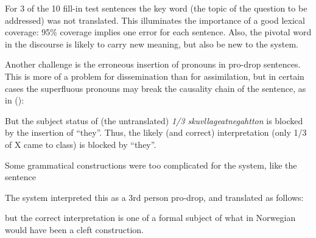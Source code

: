 For 3 of the 10 fill-in test sentences the key word (the topic of
the question to be addressed) was not translated. This illuminates
the importance of a good lexical coverage: 95\% coverage implies
one error for each sentence. Also, the pivotal word in the discourse
is likely to carry new meaning, but also be new to
the system. 

Another challenge is the erroneous insertion of pronouns in pro-drop
sentences. This is more of a problem for dissemination than for
assimilation, but in certain cases the superfluous pronouns may
break the causality chain of the sentence, as in ():


{}

But the subject status of (the untranslated) \textit{1/3 skuvllageatnegahtton}
is blocked by the insertion of ``they''. Thus, the likely (and
correct) interpretation (only 1/3 of X came to class) is blocked
by ``they''.



Some grammatical constructions were too complicated for the system, 
like the sentence



The system interpreted this as a 3rd person pro-drop, and translated
as follows:

but the correct interpretation is one of a formal subject of
what in Norwegian would have been a cleft construction.

